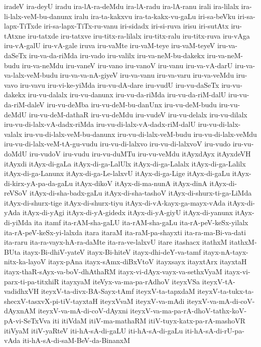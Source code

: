 {iradeV
ira-deyU
iradu
ira-lA-ra-deMdu
ira-lA-radu
ira-lA-ranu
irali
ira-lilalx
ira-li-lalx-veM-bu-danunx
iralu
ira-ta-kakxvu
ira-ta-kakx-vu-gaLu
iri-sa-beVku
iri-sa-lapx-TiTxde
iri-sa-lapx-TiTx-ru-vanu
iri-sidadx
iri-si-ruva
irisu
iri-sutAtx
iru-tAtxne
iru-tatxde
iru-tatxve
iru-titx-ra-lilalx
iru-titx-ralu
iru-titx-ruva
iru-vAga
iru-vA-galU
iru-vA-gale
iruva
iru-vaMte
iru-vaM-teye
iru-vaM-teyeV
iru-va-daSeTx
iru-va-da-riMda
iru-vado
iru-valilx
iru-va-neM-bu-dakekx
iru-va-neM-budu
iru-va-neMdu
iru-vaneV
iru-vano
iru-vanoV
iru-vanu
iru-va-vA-darU
iru-va-va-lalx-veM-budu
iru-va-va-nA-giyeV
iru-va-vanu
iru-va-varu
iru-va-veMdu
iru-vavo
iru-vavu
iru-vi-ke-yiMda
iru-vu-dA-dare
iru-vudU
iru-vu-daSeTx
iru-vu-dakekx
iru-vu-dalalx
iru-vu-danunx
iru-vu-da-riMda
iru-vu-da-riM-dalU
iru-vu-da-riM-daleV
iru-vu-deMba
iru-vu-deM-bu-danUnx
iru-vu-deM-budu
iru-vu-deMdU
iru-vu-deM-dathaR
iru-vu-deMdu
iru-vudeV
iru-vu-delalx
iru-vu-dilalx
iru-vu-di-lalx-vA-dadx-riMda
iru-vu-di-lalx-vA-dadx-riM-dalU
iru-vu-di-lalx-valalx
iru-vu-di-lalx-veM-bu-danunx
iru-vu-di-lalx-veM-budu
iru-vu-di-lalx-veMdu
iru-vu-di-lalx-veM-tA-gu-vudu
iru-vu-di-lalxvo
iru-vu-di-lalxvoV
iru-vudo
iru-vu-doMdU
iru-vudoV
iru-vudu
iru-vu-duMTu
iru-vu-veMdu
itAyxdAyx
itAyxdeVH
itAyxdi
itAyx-di-gaLa
itAyx-di-ga-LalUlx
itAyx-di-ga-Lalalx
itAyx-di-ga-Lalilx
itAyx-di-ga-Lanunx
itAyx-di-ga-Le-lalxvU
itAyx-di-ga-Lige
itAyx-di-gaLu
itAyx-di-kirx-yA-pa-da-gaLu
itAyx-dikoV
itAyx-di-ma-nunA
itAyx-dinA
itAyx-di-reVSoV
itAyx-di-sha-badx-gaLu
itAyx-di-sha-tashoV
itAyx-di-shurx-ti-ga-LiMda
itAyx-di-shurx-tige
itAyx-di-shurx-tiyu
itAyx-di-vA-kayx-ga-mayx-vAda
itAyx-di-yAda
itAyx-di-yAgi
itAyx-di-yA-gidedx
itAyx-di-yA-giyU
itAyx-di-yanunx
itAyx-di-yiMda
ita
itamf
ita-rAM-sha-gaLU
ita-rAM-sha-gaLu
ita-rA-peV-keSx-yilalx
ita-rA-peV-keSx-yi-lalxda
itara
itaraM
ita-raM-pa-shayxti
ita-ra-ma-Bi-va-dati
ita-raru
ita-ra-vayx-hA-ra-daMte
ita-ra-ve-lalxvU
itare
itashacx
itathxM
itathxM-BUta
itayx-Bi-dhiV-yateV
itayx-Bi-hiteV
itayx-dhi-deY-va-tamf
itayx-nA-tayx-nitx-ka-layoV
itayx-pAna
itayx-sAmx-diBxVtoV
itayxsayx
itayxtArx
itayxtaH
itayx-thaR-sAyx-va-boV-dhAthaRM
itayx-vi-dAyx-vayx-va-sethxVyaM
itayx-vi-parx-ti-pa-titxhiR
itayxyaM
iteVyx-va-ma-pa-rAdhoV
iteyxVSa
iteyxV-tA-vadidhxVH
iteyxV-ta-divx-BA-Sayx-tAmf
iteyxV-ta-tapxdaM
iteyxV-ta-tukx-ta-shecxV-tasxvX-pi-tiV-tayxtaH
iteyxVvaM
iteyxV-va-mAdi
iteyxV-va-mA-di-coV-dAyxnAM
iteyxV-va-mA-di-coV-dAyxni
iteyxV-va-ma-pa-rA-dhoV-tathx-koV-pA-vi-SeTxVva
iti
itiVdaM
itiV-ma-mathaRM
itiV-tuyx-katx-pa-rA-mashoVR
itiVyaM
itiV-yaRteV
iti-hA-sA-di-gaLU
iti-hA-sA-di-gaLu
iti-hA-sA-di-rU-pa-vAda
iti-hA-sA-di-saM-BeV-da-BinanxM
}
